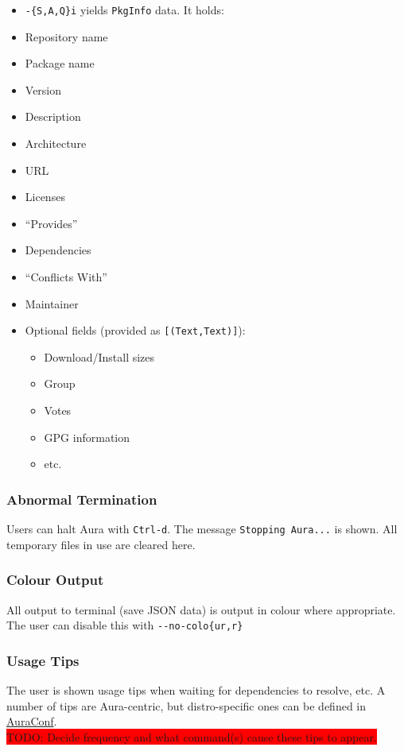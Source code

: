 \documentclass{article}
\begin{document}
\begin{itemize}
\itemsep1pt\parskip0pt
\item
  \texttt{-\{S,A,Q\}i} yields \texttt{PkgInfo} data. It holds:
\item
  Repository name
\item
  Package name
\item
  Version
\item
  Description
\item
  Architecture
\item
  URL
\item
  Licenses
\item
  ``Provides''
\item
  Dependencies
\item
  ``Conflicts With''
\item
  Maintainer
\item
  Optional fields (provided as \texttt{{[}(Text,Text){]}}):

  \begin{itemize}
  \itemsep1pt\parskip0pt
  \item
    Download/Install sizes
  \item
    Group
  \item
    Votes
  \item
    GPG information
  \item
    etc.
  \end{itemize}
\end{itemize}

\subsubsection{Abnormal Termination}\label{abnormal-termination}
Users can halt Aura with \texttt{Ctrl-d}. The message
\texttt{Stopping Aura...} is shown. All temporary files in use are
cleared here.

\subsubsection{Colour Output}\label{colour-output}
All output to terminal (save JSON data) is output in colour where
appropriate. The user can disable this with
\colorbox{Apricot}{\texttt{-\/-no-colo\{ur,r\}}}

\subsubsection{Usage Tips}
The user is shown usage tips when waiting for dependencies to resolve, etc.
A number of tips are Aura-centric, but distro-specific ones can be defined
in \hyperref[auraconf]{AuraConf}.\\
\colorbox{Red}{TODO: Decide frequency and what command(s) cause these
tips to appear.}
\end{document}
